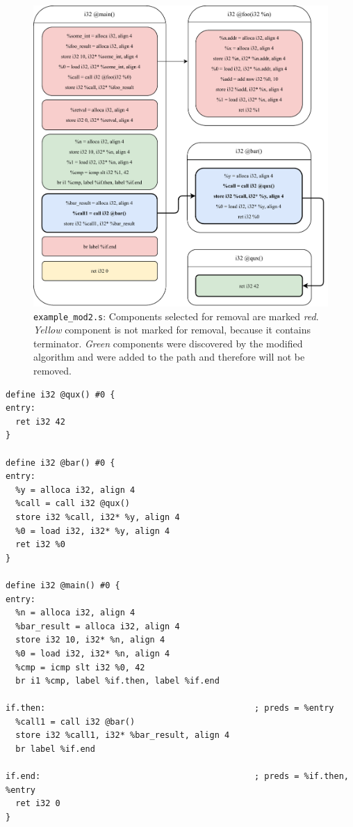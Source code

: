 \documentclass[12pt, twoside]{fithesis2}
\renewcommand{\_}{\leavevmode \kern0.07em\vbox{\hrule width0.4em}}
\begin{document}
\begin{figure}[ht]
    \centering
    \includegraphics[]{images/example_mod2/example_mod2_removing_prepare.pdf}
    \caption{
    \texttt{example_mod2.s}:
    Components selected for removal are marked \emph{red}.
    \emph{Yellow} component is not marked for removal, because it contains
    terminator. \emph{Green} components were discovered by the modified
    algorithm and were added to the path and therefore will not be removed.
    }
    \label{fig:mod2_prepare}
\end{figure}


\begin{verbatim}
define i32 @qux() #0 {
entry:
  ret i32 42
}

define i32 @bar() #0 {
entry:
  %y = alloca i32, align 4
  %call = call i32 @qux()
  store i32 %call, i32* %y, align 4
  %0 = load i32, i32* %y, align 4
  ret i32 %0
}

define i32 @main() #0 {
entry:
  %n = alloca i32, align 4
  %bar_result = alloca i32, align 4
  store i32 10, i32* %n, align 4
  %0 = load i32, i32* %n, align 4
  %cmp = icmp slt i32 %0, 42
  br i1 %cmp, label %if.then, label %if.end

if.then:                                          ; preds = %entry
  %call1 = call i32 @bar()
  store i32 %call1, i32* %bar_result, align 4
  br label %if.end

if.end:                                           ; preds = %if.then, %entry
  ret i32 0
}
\end{verbatim}
\end{document}
